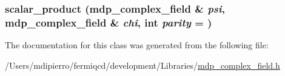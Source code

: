 \label{classmdp__complex__field_a0936375b6edd3f01728d16ac38c76c32}
\hypertarget{classmdp__complex__field_a7a6ea38341405f2cc4e771b33b4ea38f}{
\subsubsection[{scalar\_\-product}]{ scalar\_\-product ({\bf mdp\_\-complex\_\-field} \& {\em psi}, \/  {\bf mdp\_\-complex\_\-field} \& {\em chi}, \/  int {\em parity} = {})}}
\label{classmdp__complex__field_a7a6ea38341405f2cc4e771b33b4ea38f}


The documentation for this class was generated from the following file:\begin{DoxyCompactItemize}
\item 
/Users/mdipierro/fermiqcd/development/Libraries/\hyperlink{mdp__complex__field_8h}{mdp\_\-complex\_\-field.h}\end{DoxyCompactItemize}
